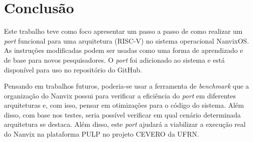 \section{Conclusão}

Este trabalho teve como foco apresentar um passo a passo de como realizar um \textit{port} funcional para uma arquitetura (RISC-V) no sistema operacional NanvixOS. 
As instruções modificadas podem ser usadas como uma forma de aprendizado e de base para novos pesquisadores. O \textit{port} foi adicionado ao sistema e está disponível para uso no repositório do GitHub.

Pensando em trabalhos futuros, poderia-se usar a ferramenta de \textit{benchmark} que a organização do Nanvix possui para verificar a eficiência do \textit{port} em diferentes arquiteturas e, com isso, pensar em otimizações para o código do sistema. Além disso, com base nos testes, seria possível verificar em qual cenário determinada arquitetura se destaca. Além disso, este \textit{port} ajudará a viabilizar a execução real do Nanvix na plataforma PULP no projeto CEVERO da UFRN.

